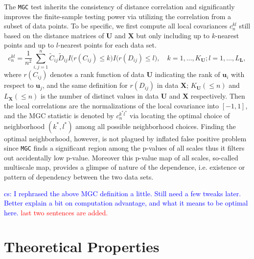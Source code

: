 \documentclass[11pt]{article}
\theoremstyle{definition}
\newcommand{\cs}[1]{\textcolor{blue}{cs: #1}}
\begin{document}
The \texttt{MGC} test inherits the consistency of distance correlation and significantly improves the finite-sample testing power via utilizing the correlation from a subset of data points. To be specific, we first compute all local covariances $c^{kl}_{n}$ still based on the distance matrices of $\mathbf{U}$ and $\mathbf{X}$ but only including up to $k$-nearest points and up to $l$-nearest points for each data set. 
\begin{equation}
\label{eq:MGC}
c^{kl}_{n} = \frac{1}{n^2} \sum\limits_{i,j=1}^{n} \tilde{C}_{ij} \tilde{D}_{ij} I\big( r(C_{ij}) \leq k \big) I\big(  r(D_{ij}) \leq l  \big), \quad k= 1, \ldots, K_{\mathbf{U}}; l =1, \ldots, L_{\mathbf{L}},
\end{equation}
where %
$r(C_{ij})$ denotes a rank function of data $\mathbf{U}$ indicating the rank of $\mathbf{u}_{i}$ with respect to $\mathbf{u}_{j}$, and the same definition for $r(D_{ij})$ in data $\mathbf{X}$; 
$K_{\mathbf{U}} (\leq n)$ and $L_{\mathbf{X}} (\leq n)$ is the number of distinct values in data $\mathbf{U}$ and $\mathbf{X}$ respectively. Then the local correlations are the normalizations of the local covariance into $[-1,1]$, and the MGC statistic is denoted by $c^{k^{*} l^{*}}_{n}$ via locating the optimal choice of neighborhood $(k^{*}, l^{*})$ among all possible neighborhood choices. Finding the optimal neighborhood, however, is not plagued by inflated false positive problem since \texttt{MGC} finds a significant region among the p-values of all scales thus it filters out accidentally low p-value. Moreover this p-value map of all scales, so-called multiscale map, provides a glimpse of nature of the dependence, i.e. existence or pattern of dependency between the two data sets. 

\cs{I rephrased the above MGC definition a little. Still need a few tweaks later. Better explain a bit on computation advantage, and what it means to be optimal here. }
\textcolor{red}{last two sentences are added.}


\section{Theoretical Properties}
\label{sec:theory}
\end{document}
